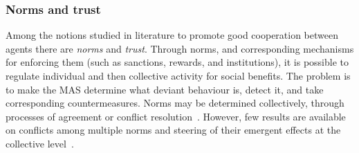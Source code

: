 \subsubsection{Norms and trust}

Among the notions 
 studied in literature
 to promote good cooperation between agents 
 there are \emph{norms} and \emph{trust}.
%
Through norms, and corresponding mechanisms for 
 enforcing them (such as sanctions, rewards, and institutions),
 it is possible to regulate individual and then collective activity
 for social benefits.
%
The problem is to make the MAS determine what deviant behaviour is,
 detect it, and take corresponding countermeasures.
%
Norms may be determined collectively,
 through processes of agreement
 or conflict resolution~\cite{DBLP:journals/aamas/SantosZSSV17}.
%
However, few results are available on conflicts among multiple norms
 and steering of their emergent effects at the collective level~\cite{DBLP:journals/aamas/SantosZSSV17}.

